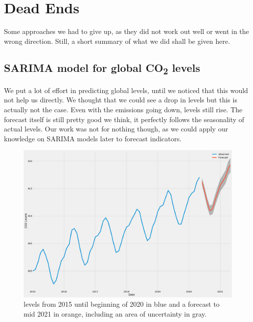 \section{Dead Ends}

Some approaches we had to give up, as they did not work out well or went in the wrong direction. Still, a short summary of what we did shall be given here.

\subsection{SARIMA model for global CO\textsubscript{2} levels}

We put a lot of effort in predicting global \co levels, until we noticed that this would not help us directly. We thought that we could see a drop in \co levels but this is actually not the case. Even with the emissions going down, levels still rise. The forecast itself is still pretty good we think, it perfectly follows the seasonality of actual \co levels. Our work was not for nothing though, as we could apply our knowledge on SARIMA models later to forecast indicators.


\begin{figure}[hb!]
	\centering
	\includegraphics[width=0.7\linewidth]{../sarima_co2/dyn_pred_forecast.pdf}
	\caption{\co levels from 2015 until beginning of 2020 in blue and a forecast to mid 2021 in orange, including an area of uncertainty in gray.}
	\label{fig:flights}
\end{figure}

